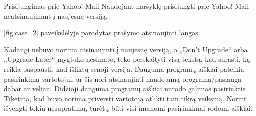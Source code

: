 ﻿\begin{xcase}{Prisijungimas prie Yahoo! Mail}
  \xcgoal
  {
    Naudojant naršyklę prisijungti prie Yahoo! Mail neatsinaujinant į naujesnę versiją.
  }
  \xctools
  {
    \ref{fig:case_2} paveikslėlyje parodytas prašymo atsinaujinti langas.

  }
  \xcresult
  {
    Kadangi nebuvo norima atsinaujinti į naujesnę versiją, o „Don't Upgrade“ arba „Upgrade Later“ 
    mygtuko nesimato, teko perskaityti visą tekstą, kad surasti, ką reikia paspausti, kad 
    išliktų senoji versija.
  }
  \xcprinciples
  {
    {
      Dauguma programų aiškiai pateikia pasirinkimą vartotojui, ar šis nori atsinaujinti
      naudojamą programą/paslaugą dabar ar vėliau.
    }
    {
      Didžioji dauguma programų aiškiai nurodo galimas pasirinktis.
    }
  }
  \xcthoughts
  {
    Tikėtina, kad buvo norima priversti vartotoją atlikti tam tikrą veiksmą. Norint išvengti 
    tokių nesupratimų, turėtų būti visi įmanomi pasirinkimai rodomi aiškiai.
  }
\end{xcase}
